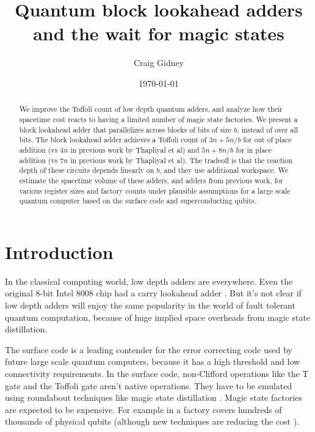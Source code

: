 \documentclass[onecolumn,unpublished]{quantumarticle}
\title{Quantum block lookahead adders and the wait for magic states}
\date{\today}
\author{Craig Gidney}
\affiliation{Google Inc., Santa Barbara, California 93117, USA}
\theoremstyle{definition}
\theoremstyle{definition}
\theoremstyle{definition}
\begin{document}
\maketitle

\begin{abstract}
We improve the Toffoli count of low depth quantum adders, and analyze how their spacetime cost reacts to having a limited number of magic state factories.
We present a block lookahead adder that parallelizes across blocks of bits of size $b$, instead of over all bits.
The block lookahead adder achieves a Toffoli count of $3n + 5n/b$ for out of place addition (vs $4n$ in previous work by Thapliyal et al) and $5n + 8n/b$ for in place addition (vs $7n$ in previous work by Thapliyal et al).
The tradeoff is that the reaction depth of these circuits depends linearly on $b$, and they use additional workspace.
We estimate the spacetime volume of these adders, and adders from previous work, for various register sizes and factory counts under plausible assumptions for a large scale quantum computer based on the surface code and superconducting qubits.
\end{abstract}

\section{Introduction}

In the classical computing world, low depth adders are everywhere.
Even the original 8-bit Intel 8008 chip had a carry lookahead adder \cite{shirriff2020reverseengineer8008}.
But it's not clear if low depth adders will enjoy the same popularity in the world of fault tolerant quantum computation, because of huge implied space overheads from magic state distillation.

The surface code \cite{fowler2012surfacereview} is a leading contender for the error correcting code used by future large scale quantum computers, because it has a high threshold and low connectivity requirements.
In the surface code, non-Clifford operations like the T gate and the Toffoli gate aren't native operations.
They have to be emulated using roundabout techniques like magic state distillation \cite{bravyi2005magicstate}.
Magic state factories are expected to be expensive.
For example in \cite{gidney2019catalyzed} a factory covers hundreds of thousands of physical qubits (although new techniques are reducing the cost \cite{litinski2019magicnotcostly}).
\end{document}
